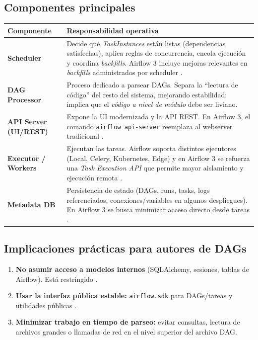 \subsection{Componentes principales}
\begin{longtable}{p{}p{}}
\toprule
\textbf{Componente} & \textbf{Responsabilidad operativa}\\
\midrule
\endhead
\textbf{Scheduler} & Decide qué \textit{TaskInstances} están listas (dependencias satisfechas), aplica reglas de concurrencia, encola ejecución y coordina \textit{backfills}. Airflow 3 incluye mejoras relevantes en \textit{backfills} administrados por scheduler \cite{airflow_blog_3_ga,airflow_release_notes_3}.\\
\textbf{DAG Processor} & Proceso dedicado a parsear DAGs. Separa la ``lectura de código'' del resto del sistema, mejorando estabilidad; implica que el \textit{código a nivel de módulo} debe ser liviano. \cite{airflow_upgrade_3_breaking}\\
\textbf{API Server (UI/REST)} & Expone la UI modernizada y la API REST. En Airflow 3, el comando \texttt{airflow api-server} reemplaza al webserver tradicional \cite{airflow_upgrade_3_breaking}.\\
\textbf{Executor / Workers} & Ejecutan las tareas. Airflow soporta distintos ejecutores (Local, Celery, Kubernetes, Edge) y en Airflow 3 se refuerza una \textit{Task Execution API} que permite mayor aislamiento y ejecución remota \cite{airflow_release_notes_3}.\\
\textbf{Metadata DB} & Persistencia de estado (DAGs, runs, tasks, logs referenciados, conexiones/variables en algunos despliegues). En Airflow 3 se busca minimizar acceso directo desde tareas \cite{airflow_upgrading_3_stable}.\\
\bottomrule
\end{longtable}

\subsection{Implicaciones prácticas para autores de DAGs}
\begin{enumerate}[leftmargin=*]
  \item \textbf{No asumir acceso a modelos internos} (SQLAlchemy, sesiones, tablas de Airflow). Está restringido \cite{airflow_upgrading_3_stable}.
  \item \textbf{Usar la interfaz pública estable:} \texttt{airflow.sdk} para DAGs/tareas y utilidades públicas \cite{airflow_public_interface}.
  \item \textbf{Minimizar trabajo en tiempo de parseo:} evitar consultas, lectura de archivos grandes o llamadas de red en el nivel superior del archivo DAG.
\end{enumerate}

